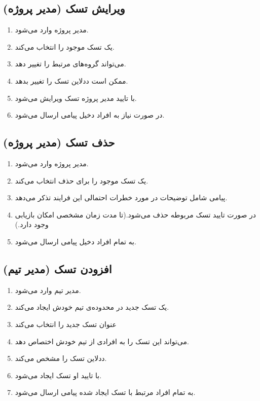 \documentclass[10pt,a4paper]{article}
\begin{document}
\subsection{
	ویرایش تسک (مدیر پروژه)
}

\begin{enumerate}
	\item 
	مدیر پروژه وارد می‌شود.
	\item
	یک تسک موجود را انتخاب می‌کند.
	\item
	می‌تواند گروه‌های مرتبط را تغییر دهد.
	\item
	ممکن است ددلاین تسک را تغییر بدهد.
	\item
	با تایید مدیر پروژه تسک ویرایش می‌شود.
	\item
	در صورت نیاز به افراد دخیل پیامی ارسال می‌شود.
\end{enumerate}

\subsection{
	حذف تسک (مدیر پروژه)
}

\begin{enumerate}
	\item 
	مدیر پروژه وارد می‌شود.
	\item
	یک تسک موجود را برای حذف انتخاب می‌کند.
	\item
	پیامی شامل توضیحات در مورد خطرات احتمالی این فرایند تذکر می‌دهد.
	\item
	در صورت تایید تسک مربوطه حذف می‌شود.(تا مدت زمان مشخصی امکان بازیابی وجود دارد.)
	\item
 به تمام افراد دخیل پیامی ارسال می‌شود.
\end{enumerate}


\subsection{
	افزودن تسک (مدیر تیم)
}
\begin{enumerate}
	\item 
	مدیر تیم وارد می‌شود.
	\item
	یک تسک جدید در محدوده‌ی تیم خودش ایجاد می‌کند.
	\item
	عنوان تسک جدید را انتخاب می‌کند
	\item
	می‌تواند این تسک را به افرادی از تیم خودش اختصاص دهد.
	\item
	ددلاین تسک را مشخص می‌کند.
	\item
	با تایید او تسک ایجاد می‌شود.
	\item
	به تمام افراد مرتبط با تسک ایجاد شده پیامی ارسال می‌شود.
\end{enumerate}
\end{document}

